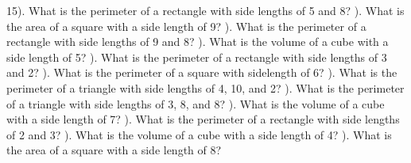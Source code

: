 \documentclass{article}%
\begin{document}
15). What is the perimeter of a rectangle with side lengths of 5 and 8?%
\newline%
\newline%
). What is the area of a square with a side length of 9?%
\newline%
\newline%
). What is the perimeter of a rectangle with side lengths of 9 and 8?%
\newline%
\newline%
). What is the volume of a cube with a side length of 5?%
\newline%
\newline%
). What is the perimeter of a rectangle with side lengths of 3 and 2?%
\newline%
\newline%
). What is the perimeter of a square with sidelength of 6?%
\newline%
\newline%
). What is the perimeter of a triangle with side lengths of 4, 10, and 2?%
\newline%
\newline%
). What is the perimeter of a triangle with side lengths of 3, 8, and 8?%
\newline%
\newline%
). What is the volume of a cube with a side length of 7?%
\newline%
\newline%
). What is the perimeter of a rectangle with side lengths of 2 and 3?%
\newline%
\newline%
). What is the volume of a cube with a side length of 4?%
\newline%
\newline%
). What is the area of a square with a side length of 8?%
\newline%
\newline%
\newline%
\end{document}
